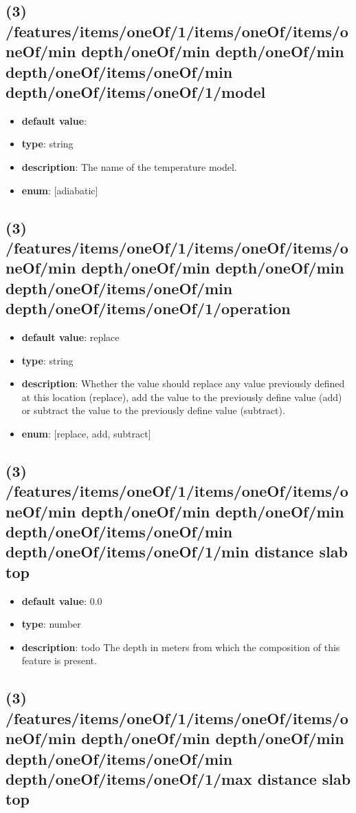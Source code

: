 \subsection{(3) /features/items/oneOf/1/items/oneOf/items/oneOf/min depth/oneOf/min depth/oneOf/min depth/oneOf/items/oneOf/min depth/oneOf/items/oneOf/1/model}
\begin{itemize}[leftmargin=3em]\item {\bf default value}: 
\item {\bf type}: string
\item {\bf description}: The name of the temperature model.
\item {\bf enum}: [adiabatic]\end{itemize}\subsection{(3) /features/items/oneOf/1/items/oneOf/items/oneOf/min depth/oneOf/min depth/oneOf/min depth/oneOf/items/oneOf/min depth/oneOf/items/oneOf/1/operation}
\begin{itemize}[leftmargin=3em]\item {\bf default value}: replace
\item {\bf type}: string
\item {\bf description}: Whether the value should replace any value previously defined at this location (replace), add the value to the previously define value (add) or subtract the value to the previously define value (subtract).
\item {\bf enum}: [replace, add, subtract]\end{itemize}\subsection{(3) /features/items/oneOf/1/items/oneOf/items/oneOf/min depth/oneOf/min depth/oneOf/min depth/oneOf/items/oneOf/min depth/oneOf/items/oneOf/1/min distance slab top}
\begin{itemize}[leftmargin=3em]\item {\bf default value}: 0.0
\item {\bf type}: number
\item {\bf description}: todo The depth in meters from which the composition of this feature is present.
\end{itemize}\subsection{(3) /features/items/oneOf/1/items/oneOf/items/oneOf/min depth/oneOf/min depth/oneOf/min depth/oneOf/items/oneOf/min depth/oneOf/items/oneOf/1/max distance slab top}
